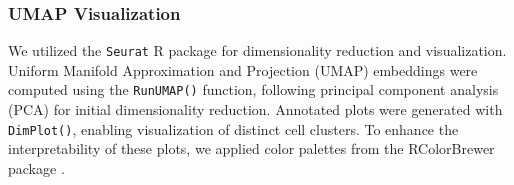 \documentclass[
  12pt]{article}
\begin{document}
\subsubsection*{UMAP Visualization}

We utilized the \texttt{Seurat} R package \cite{hao2023dictionary} for dimensionality reduction and visualization. Uniform Manifold Approximation and Projection (UMAP) embeddings were computed using the \texttt{RunUMAP()} function, following principal component analysis (PCA) for initial dimensionality reduction. Annotated plots were generated with \texttt{DimPlot()}, enabling visualization of distinct cell clusters. To enhance the interpretability of these plots, we applied color palettes from the RColorBrewer package \cite{RColorBrewer}.

\bigskip


%

\end{document}
